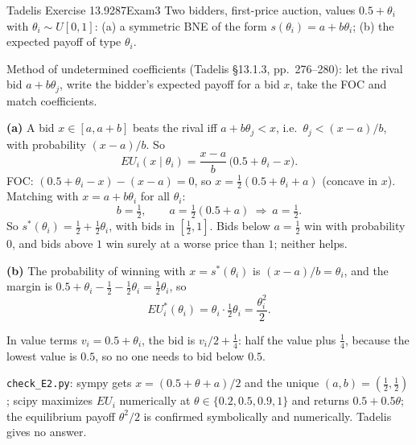 \begin{exsol}{Tadelis Exercise 13.9}{287}{Exam}{3}
\asked Two bidders, first-price auction, values $0.5+\theta_i$ with $\theta_i\sim U[0,1]$: (a) a
symmetric BNE of the form $s(\theta_i)=a+b\theta_i$; (b) the expected payoff of type $\theta_i$.

\method Method of undetermined coefficients (Tadelis \S13.1.3, pp.~276--280): let the rival bid
$a+b\theta_j$, write the bidder's expected payoff for a bid $x$, take the FOC and match
coefficients.

\solution
\textbf{(a)} A bid $x\in[a,a+b]$ beats the rival iff $a+b\theta_j<x$, i.e.\ $\theta_j<(x-a)/b$, with
probability $(x-a)/b$. So
\[
  EU_i(x\mid\theta_i)=\frac{x-a}{b}\,\bigl(0.5+\theta_i-x\bigr).
\]
FOC: $(0.5+\theta_i-x)-(x-a)=0$, so $x=\tfrac12(0.5+\theta_i+a)$ (concave in $x$). Matching
with $x=a+b\theta_i$ for all $\theta_i$:
\[
  b=\tfrac12,\qquad a=\tfrac12(0.5+a)\ \Rightarrow\ a=\tfrac12 .
\]
So $s^*(\theta_i)=\tfrac12+\tfrac12\theta_i$, with bids in $[\tfrac12,1]$. Bids below $a=\tfrac12$ win
with probability $0$, and bids above $1$ win surely at a worse price than $1$; neither helps.

\textbf{(b)} The probability of winning with $x=s^*(\theta_i)$ is $(x-a)/b=\theta_i$, and the margin is
$0.5+\theta_i-\tfrac12-\tfrac12\theta_i=\tfrac12\theta_i$, so
\[
  EU_i^*(\theta_i)=\theta_i\cdot\tfrac12\theta_i=\frac{\theta_i^{2}}{2}.
\]

\interp In value terms $v_i=0.5+\theta_i$, the bid is $v_i/2+\tfrac14$: half the value plus
$\tfrac14$, because the lowest value is $0.5$, so no one needs to bid below $0.5$.

\verify \texttt{check\_E2.py}: sympy gets $x=(0.5+\theta+a)/2$ and the unique $(a,b)=(\tfrac12,\tfrac12)$;
scipy maximizes $EU_i$ numerically at $\theta\in\{0.2,0.5,0.9,1\}$ and returns $0.5+0.5\theta$; the
equilibrium payoff $\theta^2/2$ is confirmed symbolically and numerically. Tadelis gives no answer.

\end{exsol}
